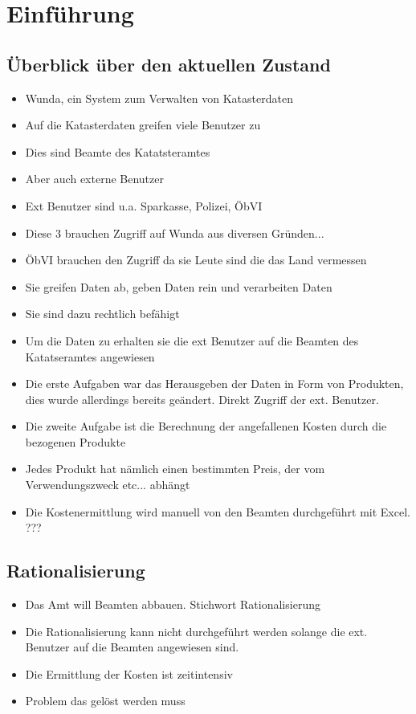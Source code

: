 \chapter{Einführung}
\section{Überblick über den aktuellen Zustand}
\begin{itemize}
\item Wunda, ein System zum Verwalten von Katasterdaten
\item Auf die Katasterdaten greifen viele Benutzer zu
\item Dies sind Beamte des Katatsteramtes
\item Aber auch externe Benutzer
\item Ext Benutzer sind u.a. Sparkasse, Polizei, \ac{ÖbVI}
\item Diese 3 brauchen Zugriff auf Wunda aus diversen Gründen...
\item \ac{ÖbVI} brauchen den Zugriff da sie Leute sind die das Land vermessen
\item Sie greifen Daten ab, geben Daten rein und verarbeiten Daten
\item Sie sind dazu rechtlich befähigt
\item Um die Daten zu erhalten sie die ext Benutzer auf die Beamten des Katatseramtes angewiesen
\item Die erste Aufgaben war das Herausgeben der Daten in Form von Produkten, dies wurde allerdings bereits geändert. Direkt Zugriff der ext. Benutzer.
\item Die zweite Aufgabe ist die Berechnung der angefallenen Kosten durch die bezogenen Produkte
\item Jedes Produkt hat nämlich einen bestimmten Preis, der vom Verwendungszweck etc... abhängt
\item Die Kostenermittlung wird manuell von den Beamten durchgeführt mit Excel. ???
\end{itemize}

\section{Rationalisierung}
\begin{itemize}
\item Das Amt will Beamten abbauen. Stichwort Rationalisierung
\item Die Rationalisierung kann nicht durchgeführt werden solange die ext. Benutzer auf die Beamten angewiesen sind.
\item Die Ermittlung der Kosten ist zeitintensiv
\item Problem das gelöst werden muss
\end{itemize}
